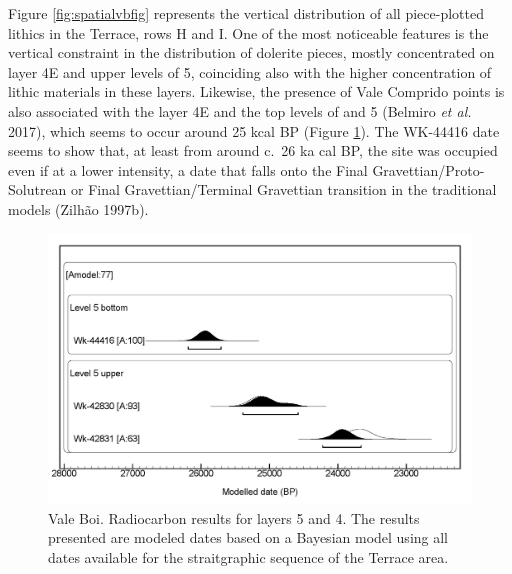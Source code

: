 \documentclass[12pt,twoside]{reedthesis}
\begin{document}
Figure \ref{fig:spatialvbfig} represents the vertical distribution of all piece-plotted lithics in the Terrace, rows H and I. One of the most noticeable features is the vertical constraint in the distribution of dolerite pieces, mostly concentrated on layer 4E and upper levels of 5, coinciding also with the higher concentration of lithic materials in these layers. Likewise, the presence of Vale Comprido points is also associated with the layer 4E and the top levels of and 5 (Belmiro \emph{et al.} 2017), which seems to occur around 25 kcal BP (Figure \ref{fig:c14VB}). The WK-44416 date seems to show that, at least from around c.~26 ka cal BP, the site was occupied even if at a lower intensity, a date that falls onto the Final Gravettian/Proto-Solutrean or Final Gravettian/Terminal Gravettian transition in the traditional models (Zilhão 1997b).
\begin{figure}

{\centering \includegraphics[width=0.6\linewidth]{figure/c14_VB} 

}

\caption{Vale Boi. Radiocarbon results for layers 5 and 4. The results presented are modeled dates based on a Bayesian model using all dates available for the straitgraphic sequence of the Terrace area.}\label{fig:c14VB}
\end{figure}
~

~
\end{document}
